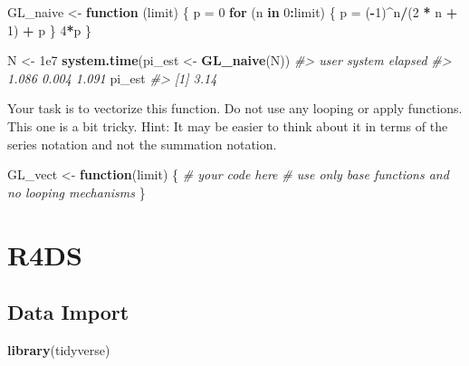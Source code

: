 \documentclass[]{book}
\newenvironment{Shaded}{\begin{snugshade}}{\end{snugshade}}
\newcommand{\CommentTok}[1]{\textcolor[rgb]{0.56,0.35,0.01}{\textit{#1}}}
\newcommand{\ControlFlowTok}[1]{\textcolor[rgb]{0.13,0.29,0.53}{\textbf{#1}}}
\newcommand{\DecValTok}[1]{\textcolor[rgb]{0.00,0.00,0.81}{#1}}
\newcommand{\FloatTok}[1]{\textcolor[rgb]{0.00,0.00,0.81}{#1}}
\newcommand{\KeywordTok}[1]{\textcolor[rgb]{0.13,0.29,0.53}{\textbf{#1}}}
\newcommand{\NormalTok}[1]{#1}
\newcommand{\OperatorTok}[1]{\textcolor[rgb]{0.81,0.36,0.00}{\textbf{#1}}}
\newcommand{\StringTok}[1]{\textcolor[rgb]{0.31,0.60,0.02}{#1}}
\theoremstyle{definition}
\theoremstyle{definition}
\theoremstyle{definition}
\theoremstyle{remark}
\begin{document}
\begin{Shaded}
\begin{Highlighting}[]
\NormalTok{GL_naive <-}\StringTok{ }\ControlFlowTok{function}\NormalTok{ (limit) \{}
\NormalTok{  p =}\StringTok{ }\DecValTok{0}
  \ControlFlowTok{for}\NormalTok{ (n }\ControlFlowTok{in} \DecValTok{0}\OperatorTok{:}\NormalTok{limit) \{}
\NormalTok{    p =}\StringTok{ }\NormalTok{(}\OperatorTok{-}\DecValTok{1}\NormalTok{)}\OperatorTok{^}\NormalTok{n}\OperatorTok{/}\NormalTok{(}\DecValTok{2} \OperatorTok{*}\StringTok{ }\NormalTok{n }\OperatorTok{+}\StringTok{ }\DecValTok{1}\NormalTok{) }\OperatorTok{+}\StringTok{ }\NormalTok{p}
\NormalTok{    \}}
  \DecValTok{4}\OperatorTok{*}\NormalTok{p}
\NormalTok{\}}

\NormalTok{N <-}\StringTok{ }\FloatTok{1e7}
\KeywordTok{system.time}\NormalTok{(pi_est <-}\StringTok{ }\KeywordTok{GL_naive}\NormalTok{(N))}
\CommentTok{#>    user  system elapsed }
\CommentTok{#>   1.086   0.004   1.091}
\NormalTok{pi_est}
\CommentTok{#> [1] 3.14}
\end{Highlighting}
\end{Shaded}

Your task is to vectorize this function. Do not use any looping or apply
functions. This one is a bit tricky. Hint: It may be easier to think
about it in terms of the series notation and not the summation notation.

\begin{Shaded}
\begin{Highlighting}[]
\NormalTok{GL_vect <-}\StringTok{ }\ControlFlowTok{function}\NormalTok{(limit) \{}
  \CommentTok{# your code here}
  \CommentTok{# use only base functions and no looping mechanisms}
\NormalTok{\}}
\end{Highlighting}
\end{Shaded}

\hypertarget{part-r4ds}{%
\part{R4DS}\label{part-r4ds}}

\hypertarget{data-import}{%
\chapter{Data Import}\label{data-import}}

\begin{Shaded}
\begin{Highlighting}[]
\KeywordTok{library}\NormalTok{(tidyverse)}
\end{Highlighting}
\end{Shaded}
\end{document}
